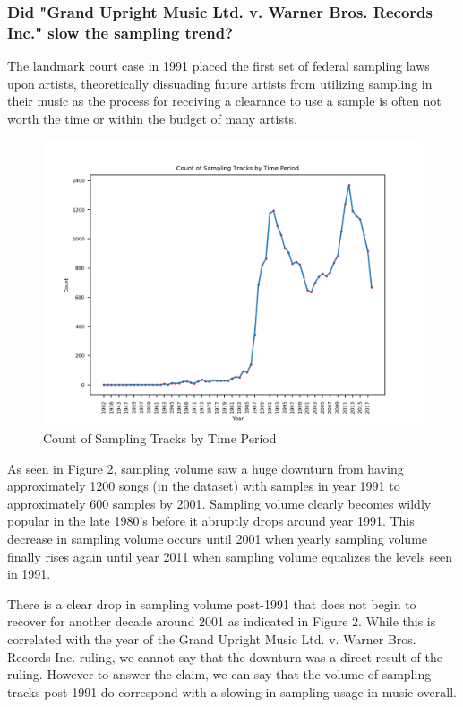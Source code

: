 \documentclass[pageno]{jpaper}
\begin{document}
\subsubsection{Did "Grand Upright Music Ltd. v. Warner Bros. Records Inc." slow the sampling trend?}
The landmark court case in 1991 placed the first set of federal sampling laws upon artists, theoretically dissuading future artists from utilizing sampling in their music as the process for receiving a clearance to use a sample is often not worth the time or within the budget of many artists.
\begin{figure}[H]
\includegraphics{TimePeriods/samplingTimePeriod}
\caption{Count of Sampling Tracks by Time Period}
\label{fig:fig2}
\centering
\end{figure}
As seen in Figure 2, sampling volume saw a huge downturn from having approximately 1200 songs (in the dataset) with samples in year 1991 to approximately 600 samples by 2001. Sampling volume clearly becomes wildly popular in the late 1980's before it abruptly drops around year 1991. This decrease in sampling volume occurs until 2001 when yearly sampling volume finally rises again until year 2011 when sampling volume equalizes the levels seen in 1991. 

There is a clear drop in sampling volume post-1991 that does not begin to recover for another decade around 2001 as indicated in Figure 2. While this is correlated with the year of the Grand Upright Music Ltd. v. Warner Bros. Records Inc. ruling, we cannot say that the downturn was a direct result of the ruling. However to answer the claim, we can say that the volume of sampling tracks post-1991 do correspond with a slowing in sampling usage in music overall.
\end{document}
